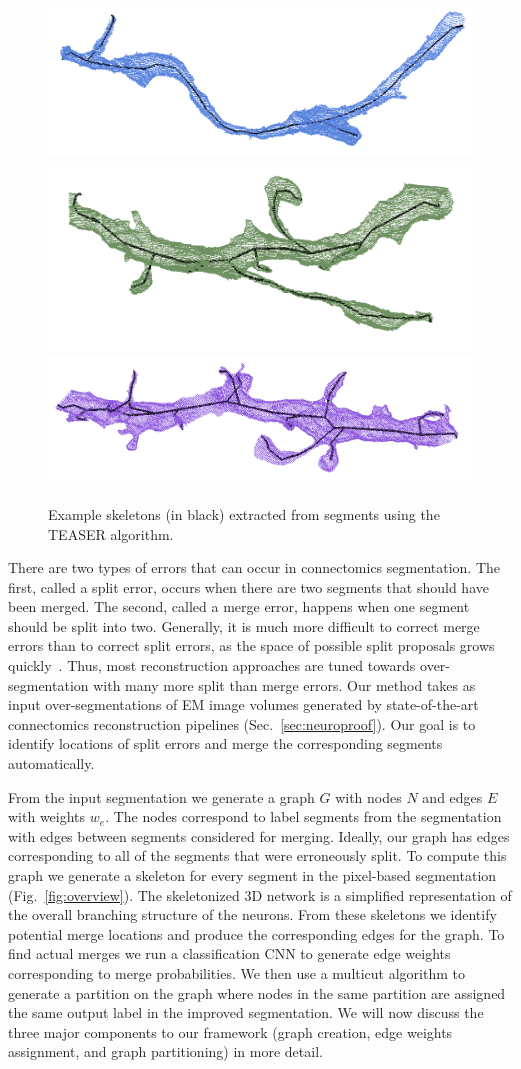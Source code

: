 \begin{figure}[t]
	\centering
	\includegraphics[width=0.32\linewidth]{./figures/skeleton1.png}
	\includegraphics[width=0.32\linewidth]{./figures/skeleton2.png}
	\includegraphics[width=0.32\linewidth]{./figures/skeleton3.png}
	\caption{Example skeletons (in black) extracted from segments using the TEASER algorithm.}
	\label{fig:skeletonization}
\end{figure}

There are two types of errors that can occur in connectomics segmentation.
The first, called a split error, occurs when there are two segments that should have been merged. The second, called a merge error, happens when one segment should be split into two. Generally, it is much more difficult to correct merge errors than to correct split errors,
as the space of possible split proposals grows quickly~\cite{parag2015properties}.
Thus, most reconstruction approaches are tuned towards over-segmentation with many more split than merge errors. Our method takes as input over-segmentations of EM image volumes generated by state-of-the-art connectomics reconstruction pipelines (Sec.~\ref{sec:neuroproof}). Our goal is to identify locations of split errors and merge the corresponding segments automatically.

From the input segmentation we generate a graph $G$ with nodes $N$ and edges $E$ with weights $w_e$. The nodes correspond to label segments from the segmentation with edges between segments considered for merging. Ideally, our graph has edges corresponding to all of the segments that were erroneously split. To compute this graph we generate a skeleton for every segment in the pixel-based segmentation (Fig.~\ref{fig:overview}). The skeletonized 3D network is a simplified representation of the overall branching structure of the neurons. From these skeletons we identify potential merge locations and produce the corresponding edges for the graph. To find actual merges we run a classification CNN to generate edge weights corresponding to merge probabilities. We then use a multicut algorithm to generate a partition on the graph where nodes in the same partition are assigned the same output label in the improved segmentation. We will now discuss the three major components to our framework (graph creation, edge weights assignment, and graph partitioning) in more detail.

